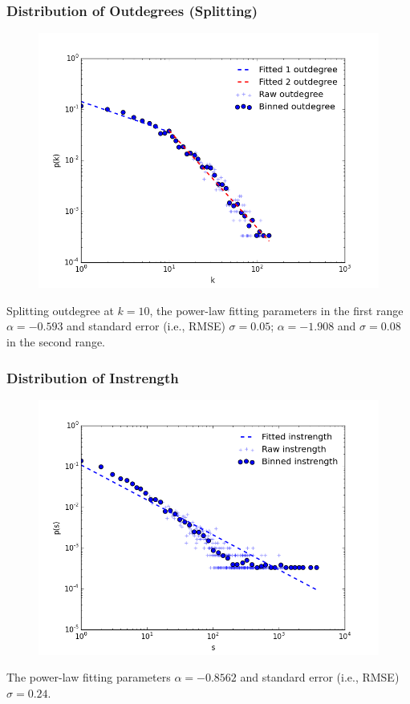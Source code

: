\documentclass{beamer}
\begin{document}
\begin{frame}
\frametitle{Distribution of Outdegrees (Splitting)}
\begin{figure}
\includegraphics[width=0.75\linewidth]{figs/outdegree_split.png}
\end{figure}
\small{Splitting outdegree at $k=10$, the power-law fitting parameters in the first range $\alpha=-0.593$ and standard error (i.e., RMSE) $\sigma= 0.05$; $\alpha=-1.908$ and $\sigma= 0.08$ in the second range.}
\end{frame}

\begin{frame}
\frametitle{Distribution of Instrength}
\begin{figure}
\includegraphics[width=0.8\linewidth]{figs/instrength.png}
\end{figure}
\small{The power-law fitting parameters $\alpha=-0.8562$ and standard error (i.e., RMSE) $\sigma= 0.24$.}
\end{frame}
\end{document}
